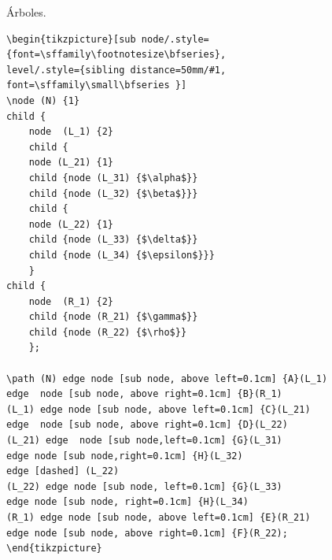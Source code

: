 \documentclass[dvipsnames,xcolor=x11names, handout]{beamer}
\theoremstyle{plain}
\theoremstyle{definition}
\begin{document}
\begin{frame}[fragile]{Árboles.}
\centering
\begin{minipage}{0.4\linewidth}
\centering
\begin{tiny}
\begin{verbatim}
\begin{tikzpicture}[sub node/.style={font=\sffamily\footnotesize\bfseries},
level/.style={sibling distance=50mm/#1,
font=\sffamily\small\bfseries }]
\node (N) {1}
child {
    node  (L_1) {2}
    child {
    node (L_21) {1}
    child {node (L_31) {$\alpha$}}
    child {node (L_32) {$\beta$}}}
    child {
    node (L_22) {1}
    child {node (L_33) {$\delta$}}
    child {node (L_34) {$\epsilon$}}}
    } 
child {
    node  (R_1) {2}
    child {node (R_21) {$\gamma$}}
    child {node (R_22) {$\rho$}}
    };
    
\path (N) edge node [sub node, above left=0.1cm] {A}(L_1)
edge  node [sub node, above right=0.1cm] {B}(R_1)
(L_1) edge node [sub node, above left=0.1cm] {C}(L_21)
edge  node [sub node, above right=0.1cm] {D}(L_22)
(L_21) edge  node [sub node,left=0.1cm] {G}(L_31)
edge node [sub node,right=0.1cm] {H}(L_32)
edge [dashed] (L_22)
(L_22) edge node [sub node, left=0.1cm] {G}(L_33)
edge node [sub node, right=0.1cm] {H}(L_34)
(R_1) edge node [sub node, above left=0.1cm] {E}(R_21)
edge node [sub node, above right=0.1cm] {F}(R_22);
\end{tikzpicture}
\end{verbatim}
\end{tiny}
\end{minipage}
\begin{minipage}{0.4\linewidth}
\vspace*{2cm}\vfill
\end{minipage}
\end{frame}
\end{document}
